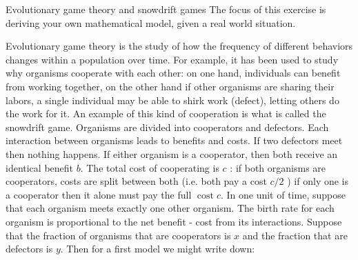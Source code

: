 \documentclass[addpoints, 11pt]{exam}
\begin{document}
\begin{questions}
\question Evolutionary game theory and snowdrift games The focus of this exercise is deriving your own mathematical model, given a real world situation.

Evolutionary game theory is the study of how the frequency of different behaviors changes within a population over time. For example, it has been used to study why organisms cooperate with each other: on one hand, individuals can benefit from working together, on the other hand if other organisms are sharing their labors, a single individual may be able to shirk work (defect), letting others do the work for it. An example of this kind of cooperation is what is called the snowdrift game. Organisms are divided into cooperators and defectors. Each interaction between organisms leads to benefits and costs. If two defectors meet then nothing happens. If either organism is a cooperator, then both receive an identical benefit $b$. The total cost of cooperating is $c$ : if both organisms are cooperators, costs are split between both (i.e. both pay a cost $c / 2$ ) if only one is a cooperator then it alone must pay the full $\operatorname{cost} c$. In one unit of time, suppose that each organism meets exactly one other organism. The birth rate for each organism is proportional to the net benefit - cost from its interactions. Suppose that the fraction of organisms that are cooperators is $x$ and the fraction that are defectors is $y$. Then for a first model we might write down:


\end{questions}
\end{document}
